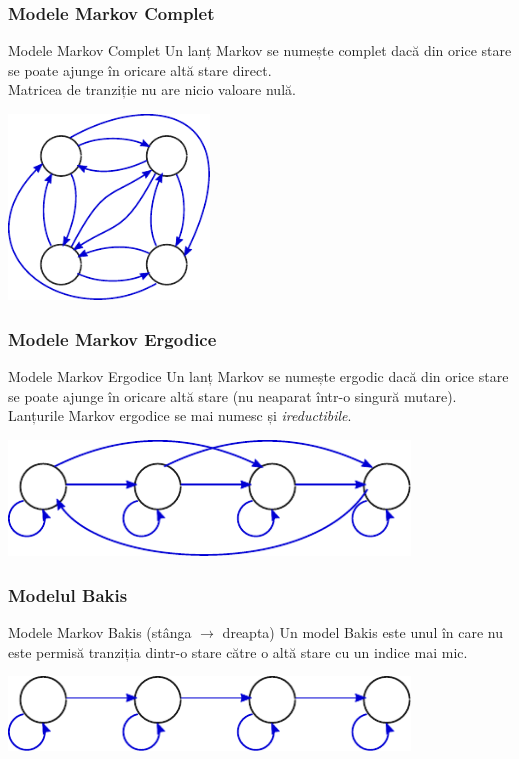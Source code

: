 \begin{frame}
  \frametitle{Modele Markov Complet}
  \begin{block}{Modele Markov Complet}
    Un lanț Markov se numește \alert{complet} dacă din orice stare se poate ajunge în oricare altă stare direct.\\
    Matricea de tranziție nu are nicio valoare nulă.
  \end{block}
  \vspace*{1em}
  \begin{center}
    \includegraphics[width=0.4\textwidth]{graphics/other-hmm/full.pdf}
  \end{center}
\end{frame}


\begin{frame}
  \frametitle{Modele Markov Ergodice}
  \begin{block}{Modele Markov Ergodice}
    Un lanț Markov se numește \alert{ergodic} dacă din orice stare se poate ajunge în oricare altă stare (nu neaparat într-o singură mutare).\\
    Lanțurile Markov ergodice se mai numesc și \emph{ireductibile}.
  \end{block}
  \vspace*{1em}
  \begin{center}
    \includegraphics[width=0.8\textwidth]{graphics/other-hmm/ergodic.pdf}
  \end{center}
\end{frame}

\begin{frame}
  \frametitle{Modelul Bakis}
  \begin{block}{Modele Markov Bakis (stânga $\longrightarrow$ dreapta)}
    Un model \alert{Bakis} este unul în care nu este permisă tranziția
    dintr-o stare către o altă stare cu un indice mai mic.
  \end{block}
  \vspace*{1em}
  \begin{center}
    \includegraphics[width=0.8\textwidth]{graphics/other-hmm/left-to-right.pdf}
  \end{center}
\end{frame}